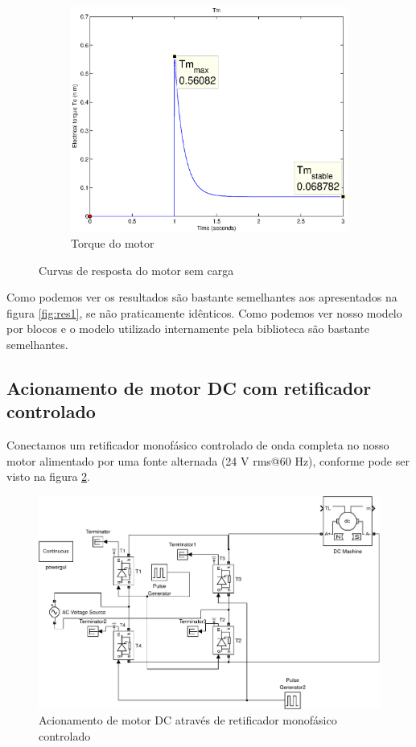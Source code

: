 \documentclass{article}
\begin{document}
\begin{figure}[H]
\begin{subfigure}[b]{0.49\linewidth}
	\end{subfigure}
	\begin{subfigure}[b]{0.49\linewidth}
		\centering
		\includegraphics[width=\linewidth]{matlab/tm3}
		\caption{Torque do motor}
	\end{subfigure}
	\caption{Curvas de resposta do motor sem carga}
	\label{fig:res3}
\end{figure}

Como podemos ver os resultados são bastante semelhantes aos apresentados na figura \ref{fig:res1}, se não praticamente idênticos. Como podemos ver nosso modelo por blocos e o modelo utilizado internamente pela biblioteca são bastante semelhantes.

\subsection{Acionamento de motor DC com retificador controlado}
Conectamos um retificador monofásico controlado de onda completa no nosso motor alimentado por uma fonte alternada (24 V rms@60 Hz), conforme pode ser visto na figura \ref{fig:sim3}.
\begin{figure}[H]
	\centering
	\includegraphics[width=\linewidth]{matlab/sim3}
	\caption{Acionamento de motor DC através de retificador monofásico controlado}
	\label{fig:sim3}
\end{figure}
\end{document}
